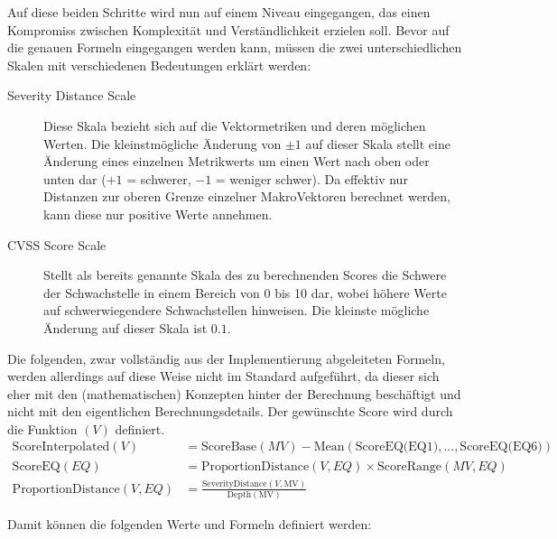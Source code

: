 Auf diese beiden Schritte wird nun auf einem Niveau eingegangen, das einen Kompromiss zwischen Komplexität und Verständlichkeit erzielen soll.
Bevor auf die genauen Formeln eingegangen werden kann, müssen die zwei unterschiedlichen Skalen mit verschiedenen Bedeutungen erklärt werden:

\begin{description}
    \item[Severity Distance Scale] Diese Skala bezieht sich auf die Vektormetriken und deren möglichen Werten.
    Die kleinstmögliche Änderung von $\pm 1$ auf dieser Skala stellt eine Änderung eines einzelnen Metrikwerts um einen Wert nach oben oder unten dar ($+1$ = schwerer, $-1$ = weniger schwer).
    Da effektiv nur Distanzen zur oberen Grenze einzelner MakroVektoren berechnet werden, kann diese nur positive Werte annehmen.
    \item[CVSS Score Scale] Stellt als bereits genannte Skala des zu berechnenden Scores die Schwere der Schwachstelle in einem Bereich von 0 bis 10 dar, wobei höhere Werte auf schwerwiegendere Schwachstellen hinweisen.
    Die kleinste mögliche Änderung auf dieser Skala ist $0.1$.
\end{description}

\newpage
Die folgenden, zwar vollständig aus der Implementierung abgeleiteten Formeln, werden allerdings auf diese Weise nicht im Standard aufgeführt, da dieser sich eher mit den (mathematischen) Konzepten hinter der Berechnung beschäftigt und nicht mit den eigentlichen Berechnungsdetails.
Der gewünschte Score wird durch die Funktion $(V)$ definiert.
\begin{align*}
    \text{ScoreInterpolated}(V) &= \text{ScoreBase}(MV) - \text{Mean}(\text{ScoreEQ(EQ1)}, ..., \text{ScoreEQ(EQ6)}) \\
    \text{ScoreEQ}(EQ) &= \text{ProportionDistance}(V, EQ) \times \text{ScoreRange}(MV, EQ) \\
    \text{ProportionDistance}(V, EQ) &= \frac{\text{SeverityDistance}(V, \text{MV})}{\text{Depth}(\text{MV})}
\end{align*}

Damit können die folgenden Werte und Formeln definiert werden:

